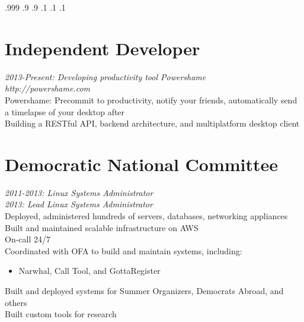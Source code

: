 \documentclass[9pt]{res} %
\begin{document}

\moveleft.999\hoffset{}  
\moveleft.9\hoffset{}
\moveleft.9\hoffset{}
\vspace{-14mm}
\moveright.1\hoffset{}
\moveright.1\hoffset{}
\moveright.1\hoffset{}
\begin{resume}

\section{Independent Developer} 

{\sl 2013-Present: Developing productivity tool Powershame  } \\
{\sl http://powershame.com } \\
{Powershame: Precommit to productivity, notify your friends, automatically send a timelapse of your desktop after}\\
{Building a RESTful API, backend architecture, and multiplatform desktop client} \\
\section{Democratic National Committee} 

{\sl 2011-2013: Linux Systems Administrator} \\
{\sl 2013: Lead Linux Systems Administrator} \\
Deployed, administered hundreds of servers, databases, networking appliances \\
Built and maintained scalable infrastructure on AWS \\
On-call 24/7 \\
Coordinated with OFA to build and maintain systems, including:
\begin{itemize} \item Narwhal, Call Tool, and GottaRegister \end{itemize}
\vspace{-4mm}
Built and deployed systems for Summer Organizers, Democrats Abroad, and others \\
Built custom tools for research\\



\end{resume}
\end{document}
